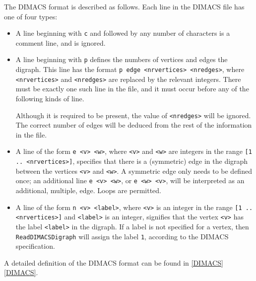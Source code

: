 \documentclass[a4paper,11pt]{report}
\begin{document}
{{{ The DIMACS format is described as follows. Each line in the DIMACS file has
one of four types: 
\begin{itemize}
\item  A line beginning with \texttt{c} and followed by any number of characters is a comment line, and is ignored. 
\item  A line beginning with \texttt{p} defines the numbers of vertices and edges the digraph. This line has the
format \texttt{p edge {\textless}nr{\textunderscore}vertices{\textgreater}
{\textless}nr{\textunderscore}edges{\textgreater}}, where \texttt{{\textless}nr{\textunderscore}vertices{\textgreater}} and \texttt{{\textless}nr{\textunderscore}edges{\textgreater}} are replaced by the relevant integers. There must be exactly one such line in
the file, and it must occur before any of the following kinds of line.

 Although it is required to be present, the value of \texttt{{\textless}nr{\textunderscore}edges{\textgreater}} will be ignored. The correct number of edges will be deduced from the rest of
the information in the file. 
\item  A line of the form \texttt{e {\textless}v{\textgreater} {\textless}w{\textgreater}}, where \texttt{{\textless}v{\textgreater}} and \texttt{{\textless}w{\textgreater}} are integers in the range \texttt{[1 .. {\textless}nr{\textunderscore}vertices{\textgreater}]}, specifies that there is a (symmetric) edge in the digraph between the
vertices \texttt{{\textless}v{\textgreater}} and \texttt{{\textless}w{\textgreater}}. A symmetric edge only needs to be defined once; an additional line \texttt{e {\textless}v{\textgreater} {\textless}w{\textgreater}}, or \texttt{e {\textless}w{\textgreater} {\textless}v{\textgreater}}, will be interpreted as an additional, multiple, edge. Loops are permitted. 
\item  A line of the form \texttt{n {\textless}v{\textgreater} {\textless}label{\textgreater}}, where \texttt{{\textless}v{\textgreater}} is an integer in the range \texttt{[1 .. {\textless}nr{\textunderscore}vertices{\textgreater}]} and \texttt{{\textless}label{\textgreater}} is an integer, signifies that the vertex \texttt{{\textless}v{\textgreater}} has the label \texttt{{\textless}label{\textgreater}} in the digraph. If a label is not specified for a vertex, then \texttt{ReadDIMACSDigraph} will assign the label \texttt{1}, according to the DIMACS specification. 
\end{itemize}
 A detailed definition of the DIMACS format can be found in \ref{DIMACS} \ref{DIMACS}. 

}}}
\end{document}
